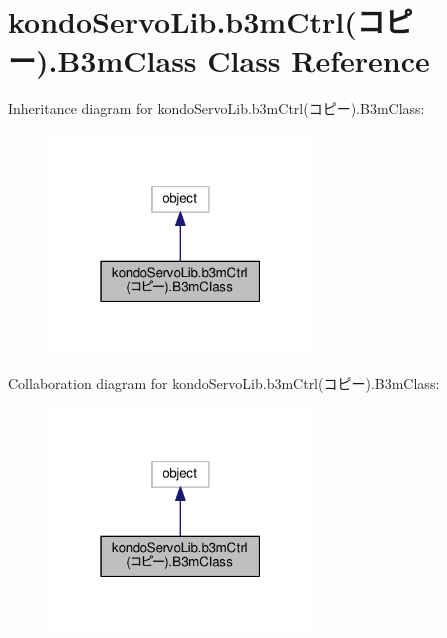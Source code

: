 \hypertarget{classkondoServoLib_1_1b3mCtrl_07_xE3_x82_xB3_xE3_x83_x94_xE3_x83_xBC_08_1_1B3mClass}{}\section{kondo\+Servo\+Lib.\+b3m\+Ctrl(コピー).B3m\+Class Class Reference}
\label{classkondoServoLib_1_1b3mCtrl_07_xE3_x82_xB3_xE3_x83_x94_xE3_x83_xBC_08_1_1B3mClass}


Inheritance diagram for kondo\+Servo\+Lib.\+b3m\+Ctrl(コピー).B3m\+Class\+:\nopagebreak
\begin{figure}[H]
\begin{center}
\leavevmode
\includegraphics[width=199pt]{classkondoServoLib_1_1b3mCtrl_07_xE3_x82_xB3_xE3_x83_x94_xE3_x83_xBC_08_1_1B3mClass__inherit__graph}
\end{center}
\end{figure}


Collaboration diagram for kondo\+Servo\+Lib.\+b3m\+Ctrl(コピー).B3m\+Class\+:\nopagebreak
\begin{figure}[H]
\begin{center}
\leavevmode
\includegraphics[width=199pt]{classkondoServoLib_1_1b3mCtrl_07_xE3_x82_xB3_xE3_x83_x94_xE3_x83_xBC_08_1_1B3mClass__coll__graph}
\end{center}
\end{figure}
